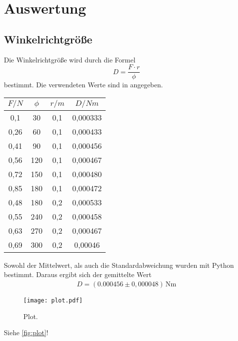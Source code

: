 \section{Auswertung}
\label{sec:Auswertung}
\subsection{Winkelrichtgröße}
Die Winkelrichtgröße wird durch die Formel
\begin{equation}
  D = \frac{F \cdot r}{\phi}
\end{equation}
bestimmt. Die verwendeten Werte sind in angegeben.
\begin{table}
  \centering
  \label{tab:winkelrichtgr}
  \begin{tabular}{c c c c}
    \toprule
    $F/N$ & $\phi$ & $r/m$ & $D/Nm$ \\
    \midrule
    0,1  &  30 & 0,1 & 0,000333\\
    0,26 &  60 & 0,1 & 0,000433\\
    0,41 &  90 & 0,1 & 0,000456\\
    0,56 & 120 & 0,1 & 0,000467\\
    0,72 & 150 & 0,1 & 0,000480\\
    0,85 & 180 & 0,1 & 0,000472\\
    0,48 & 180 & 0,2 & 0,000533\\
    0,55 & 240 & 0,2 & 0,000458\\
    0,63 & 270 & 0,2 & 0,000467\\
    0,69 & 300 & 0,2 & 0,00046\\
    \bottomrule
  \end{tabular}
\end{table}

Sowohl der Mittelwert, als auch die Standardabweichung wurden mit Python bestimmt. Daraus ergibt sich der
gemittelte Wert
\begin{align*}
    D = (0.000456 \pm 0{,}000048)\,\mathrm{Nm}
\end{align*}

\begin{figure}
  \centering
  \texttt{[image: plot.pdf]}
  \caption{Plot.}
  \label{fig:plot}
\end{figure}


Siehe \autoref{fig:plot}!
